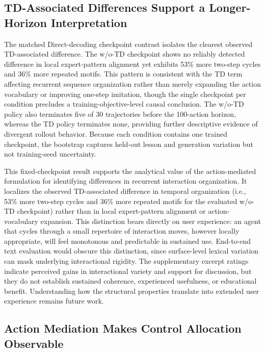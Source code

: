 \documentclass[manuscript,review,anonymous]{acmart}
\begin{document}
\subsection{TD-Associated Differences Support a Longer-Horizon Interpretation}

The matched Direct-decoding checkpoint contrast isolates the clearest observed
TD-associated difference. The w/o-TD checkpoint shows no reliably detected
difference in local expert-pattern alignment yet exhibits 53\% more two-step
cycles and 36\% more repeated motifs. This pattern is consistent with the TD
term affecting recurrent sequence organization rather than merely expanding
the action vocabulary or improving one-step imitation, though the single
checkpoint per condition precludes a training-objective-level causal
conclusion. The w/o-TD policy also terminates five of 30 trajectories before the
100-action horizon, whereas the TD policy terminates none, providing further
descriptive evidence of divergent rollout behavior. Because each condition
contains one trained checkpoint, the bootstrap captures held-out lesson and
generation variation but not training-seed uncertainty.

This fixed-checkpoint result supports the analytical value of the
action-mediated formulation for identifying differences in recurrent
interaction organization. It localizes the observed TD-associated difference in temporal organization
(i.e., 53\% more two-step cycles and 36\% more repeated motifs for the evaluated
w/o-TD checkpoint) rather than in local expert-pattern alignment or
action-vocabulary expansion. This distinction bears directly on user
experience: an agent that cycles through a small repertoire of interaction
moves, however locally appropriate, will feel monotonous and predictable in
sustained use. End-to-end text evaluation would obscure this distinction, since
surface-level lexical variation can mask underlying interactional rigidity.
The supplementary excerpt ratings indicate perceived gains in interactional
variety and support for discussion, but they do not establish sustained
coherence, experienced usefulness, or educational benefit. Understanding how
the structural properties translate into extended user experience remains
future work.

\subsection{Action Mediation Makes Control Allocation Observable}
\end{document}
